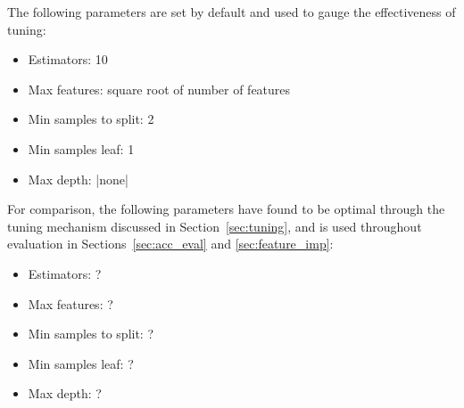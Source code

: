 The following parameters are set by default and used to gauge the effectiveness
of tuning:
\begin{itemize}
  \item Estimators: 10
  \item Max features: square root of number of features
  \item Min samples to split: 2
  \item Min samples leaf: 1
  \item Max depth: |none|
\end{itemize}

For comparison, the following parameters have found to be optimal through the tuning mechanism
discussed in Section~\ref{sec:tuning}, and is used throughout evaluation in
Sections~\ref{sec:acc_eval} and \ref{sec:feature_imp}:
\begin{itemize}
  \item Estimators: ?
  \item Max features: ?
  \item Min samples to split: ?
  \item Min samples leaf: ?
  \item Max depth: ?
\end{itemize}
